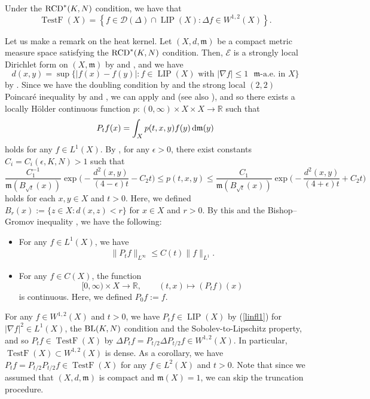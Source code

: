 \documentclass[pdftex]{sigma}
\numberwithin{equation}{section}
\theoremstyle{definition}
\newcommand{\LIP}{\operatorname{LIP}}
\newcommand{\TestF}{\operatorname{TestF}}
\newcommand{\R}{\mathbb{R}}
\newcommand{\mf}{\mathfrak{m}}
\newcommand{\RCD}{{\rm RCD}^\ast}
\newcommand{\BL}{{\rm BL}}
\newcommand{\D}{\mathcal{D}}
\begin{document}
Under the $\RCD(K,N)$ condition, we have that
\[
\TestF(X)=\left\{f\in\D(\Delta)\cap \LIP(X)\colon \Delta f\in W^{1,2}(X)\right\} .
\]

Let us make a remark on the heat kernel.
Let $(X,d,\mf)$ be a compact metric measure space satisfying the $\RCD(K,N)$ condition.
Then, $\mathcal{E}$ is a strongly local Dirichlet form on $(X,\mf)$ by \cite[Proposition~4.8]{AGS1} and \cite[Proposition~4.11]{AGS2}, and we have
\[
d(x,y)=\sup\{|f(x)-f(y)|\colon\text{$f\in \LIP(X)$ with $|\nabla f|\leq 1$ $\mf$-a.e.\ in $X$}\}
\]
by \cite[Theorem~3.9]{AGS3}.
Since we have the doubling condition by \cite[Corollary~2.4]{Stu} and the strong local $(2,2)$ Poincar\'{e} inequality \cite[Property (Ic)]{Stu3} by \cite[Theorem~1.1]{Raj} and \cite[Theorem~1]{HK}, %
we can apply \cite[Proposition~2.3]{Stu2} and \cite[Proposition~3.1]{Stu3} (see also \cite[Theorem~3.5]{Stu3}), and so there exists a locally H\"{o}lder continuous function $p\colon (0,\infty)\times X\times X\to\R$ such that
\[
P_t f (x)=\int_X p(t,x,y) f(y)\,{\rm d}\mf(y)
\]
holds for any $f\in L^1(X)$.
By \cite[Theorem~1.2]{JLZ}, for any $\epsilon>0$, there exist constants $C_i=C_i(\epsilon,K,N)>1$ such that
\[
\frac{C_1^{-1}}{\mf(B_{\sqrt{t}}(x))}\exp\bigg(\!{-}\frac{d^2(x,y)}{(4-\epsilon)t}-C_2 t\bigg)\leq
p(t,x,y)\leq \frac{C_1}{\mf(B_{\sqrt{t}}(x))}\exp\bigg(\!{-}\frac{d^2(x,y)}{(4+\epsilon)t}+C_2 t\bigg)
\]
holds for each $x,y\in X$ and $t>0$.
Here, we defined $B_r(x):=\{z\in X\colon d(x,z)<r\}$ for $x\in X$ and $r>0$.
By this and the Bishop--Gromov inequality \cite[Theorem~2.3]{Stu},
we have the following:
\begin{itemize}\itemsep=0pt
\item For any $f\in L^1(X)$, we have
\begin{gather}\label{linfl1}
\|P_t f\|_{L^\infty}\leq C(t)\|f\|_{L^1}.
\end{gather}
\item For any $f\in C(X)$, the function
\[
[0,\infty)\times X\to \R,\qquad (t,x)\mapsto (P_t f)(x)
\]
is continuous. Here, we defined $P_0 f:=f$.
\end{itemize}
For any $f\in W^{1,2}(X)$ and $t>0$, we have $P_t f\in \LIP(X)$ by (\ref{linfl1}) for $|\nabla f|^2\in L^1(X)$, the $\BL(K,N)$ condition and the Sobolev-to-Lipschitz property, and so $P_t f\in \TestF(X)$ by $\Delta P_t f=P_{t/2}\Delta P_{t/2} f\in W^{1,2}(X)$.
In particular, $\TestF(X)\subset W^{1,2}(X)$ is dense.
As a corollary, we have $P_t f=P_{t/2}P_{t/2}f\in \TestF(X)$ for any $f\in L^2(X)$ and $t>0$.
Note that since we assumed that $(X,d,\mf)$ is compact and $\mf(X)=1$, we can skip the truncation procedure.
\end{document}
